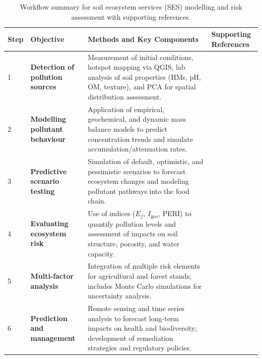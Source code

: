 \documentclass[sn-mathphys-num]{sn-jnl}
\begin{document}
\begin{table}[htbp]
\centering
\caption{Workflow summary for soil ecosystem services (SES) modelling and
    risk assessment with supporting references.}
\label{tab:ses_workflow_v2}
\begin{tabularx}{\textwidth}{|l|X|p{6.5cm}|X|}
\hline
\textbf{Step} & \textbf{Objective} & \textbf{Methods and Key Components}
    & \textbf{Supporting References} \\ \hline
1 & \textbf{Detection of pollution sources}
    & Measurement of initial conditions, hotspot mapping via QGIS, lab
      analysis of soil properties (HMs, pH, OM, texture), and PCA for
      spatial distribution assessment.
    & \cite{Adewumi2024,ElSorogy2025,Feng2024,Lemenkova2021,Mukhopadhyay2020,Wan2019} \\ \hline
2 & \textbf{Modelling pollutant behaviour}
    & Application of empirical, geochemical, and dynamic mass balance models
      to predict concentration trends and simulate accumulation/attenuation
      rates.
    & \cite{Giannakis2017,Koukianaki2025,LindhLemenkova2022b,Mohammad2025,PerezLucas2025,Xu2026} \\ \hline
3 & \textbf{Predictive scenario testing}
    & Simulation of default, optimistic, and pessimistic scenarios to
      forecast ecosystem changes and modeling pollutant pathways into the
      food chain.
    & \cite{Appel2022,GonzalezRodriguez2011,Hossini2025,Lemenkova2024a,Wang2025,Yasir2025} \\ \hline
4 & \textbf{Evaluating ecosystem risk}
    & Use of indices ($E_f$, $I_{\mathrm{geo}}$, PERI) to quantify pollution
      levels and assessment of impacts on soil structure, porosity, and
      water capacity.
    & \cite{AnsoarRodriguez2025,Chukwuonye2025,Egbueri2020,Ferreira2022,Kim2024,Li2025a} \\ \hline
5 & \textbf{Multi-factor analysis}
    & Integration of multiple risk elements for agricultural and forest
      stands; includes Monte Carlo simulations for uncertainty analysis.
    & \cite{Lemenkova2025c,Li2025a,Lu2020,Olah2025,Proshad2025,Wang2024b} \\ \hline
6 & \textbf{Prediction and management}
    & Remote sensing and time series analysis to forecast long-term impacts
      on health and biodiversity; development of remediation strategies and
      regulatory policies.
    & \cite{Fan2025,Lemenkova2025e,Lemenkova2025d,Pan2019,Stojic2019,Xu2025} \\ \hline
\end{tabularx}
\end{table}
\end{document}
